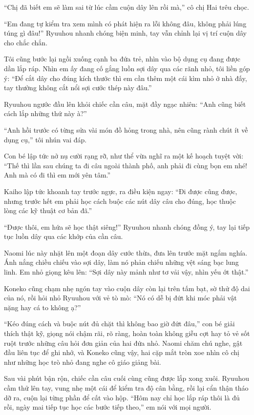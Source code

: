 ﻿\documentclass[../main.tex]{subfiles}
\begin{document}
``Chị đã biết em sẽ làm sai từ lúc cầm cuộn dây lên rồi mà,'' cô chị Hai trêu chọc.

``Em đang tự kiểm tra xem mình có phát hiện ra lỗi không đâu, không phải lúng túng gì đâu!'' Ryuuhou nhanh chóng biện minh, tay vẫn chỉnh lại vị trí cuộn dây cho chắc chắn.

Tôi cũng bước lại ngồi xuống cạnh ba đứa trẻ, nhìn vào bộ dụng cụ đang được dần lắp ráp. Nhìn em ấy đang cố gắng luồn sợi dây qua các rãnh nhỏ, tôi liền góp ý: ``Để cắt dây cho đúng kích thước thì em cần thêm một cái kìm nhỏ ở nhà đấy, tay thường không cắt nổi sợi cước thép này đâu.''

Ryuuhou ngước đầu lên khỏi chiếc cần câu, mặt đầy ngạc nhiên: ``Anh cũng biết cách lắp những thứ này à?''

``Anh hồi trước có từng sửa vài món đồ hỏng trong nhà, nên cũng rành chút ít về dụng cụ,'' tôi nhún vai đáp.

Con bé lập tức nở nụ cười rạng rỡ, như thể vừa nghĩ ra một kế hoạch tuyệt vời: ``Thế thì lần sau chúng ta đi câu ngoài thành phố, anh phải đi cùng bọn em nhé! Anh mà có đi thì em mới yên tâm.''

Kaiho lập tức khoanh tay trước ngực, ra điều kiện ngay: ``Đi được cũng được, nhưng trước hết em phải học cách buộc các nút dây câu cho đúng, học thuộc lòng các kỹ thuật cơ bản đã.''

``Được thôi, em hứa sẽ học thật siêng!'' Ryuuhou nhanh chóng đồng ý, tay lại tiếp tục luồn dây qua các khớp của cần câu.

Naomi lúc này nhặt lên một đoạn dây cước thừa, đưa lên trước mặt ngắm nghía. Ánh nắng chiều chiếu vào sợi dây, làm nó phản chiếu những vệt sáng bạc lung linh. Em nhỏ giọng kêu lên: ``Sợi dây này mảnh như tơ vải vậy, nhìn yếu ớt thật.''

Koneko cũng chạm nhẹ ngón tay vào cuộn dây còn lại trên tấm bạt, sờ thử độ dai của nó, rồi hỏi nhỏ Ryuuhou với vẻ tò mò: ``Nó có dễ bị đứt khi móc phải vật nặng hay cá to không ạ?''

``Kéo đúng cách và buộc nút đủ chặt thì không bao giờ đứt đâu,'' con bé giải thích thật kỹ, giọng nói chậm rãi, rõ ràng, hoàn toàn không giễu cợt hay tỏ vẻ sốt ruột trước những câu hỏi đơn giản của hai đứa nhỏ. Naomi chăm chú nghe, gật đầu liên tục để ghi nhớ, và Koneko cũng vậy, hai cặp mắt tròn xoe nhìn cô chị như những học trò nhỏ đang nghe cô giáo giảng bài.

Sau vài phút bận rộn, chiếc cần câu cuối cùng cũng được lắp xong xuôi. Ryuuhou cầm thử lên tay, vung nhẹ một cái để kiểm tra độ cân bằng, rồi lại cẩn thận tháo dỡ ra, cuộn lại từng phần để cất vào hộp. ``Hôm nay chỉ học lắp ráp thôi là đủ rồi, ngày mai tiếp tục học các bước tiếp theo,'' em nói với mọi người.
\end{document}
